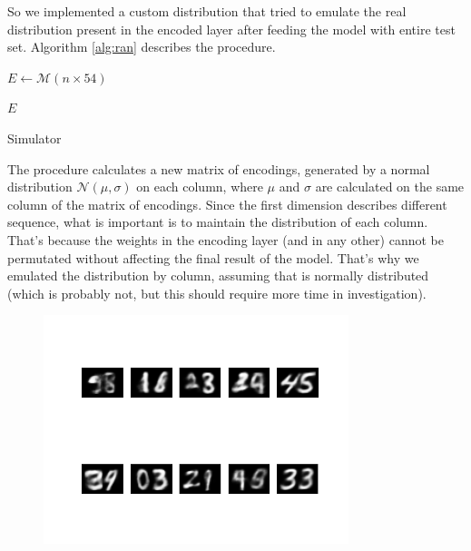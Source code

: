 \documentclass[compsoc]{IEEEtran}
\begin{document}
So we implemented a custom distribution that tried to emulate the real distribution
present in the encoded layer after feeding the model with entire test set. Algorithm \ref{alg:ran} describes the procedure.

\begin{algorithm}[h]
\SetAlgoLined
{}

$E \gets \mathcal{M}(n \times 54)$\;



\Return $E$\;

\caption{Simulator}\label{alg:ran}
\end{algorithm}

The procedure calculates a new matrix of encodings, generated by a normal distribution $\mathcal{N}(\mu, \sigma)$ on each column, where $\mu$ and $\sigma$ are calculated on the same column of the matrix of encodings. Since the first dimension describes different sequence, what is important is to maintain the distribution
of each column. That's because the weights in the encoding layer (and in any other) cannot be permutated without affecting the final result of the model. That's why we emulated the distribution by column, assuming that is normally distributed (which is probably not, but this should require more time in investigation). 


\begin{figure}[ht!]
\centering                                                                        
\includegraphics[width=3.5in]{gen.png}
\captionsetup{justification=centering}
\caption{}
\label{fig:gen}
\end{figure}
\end{document}
